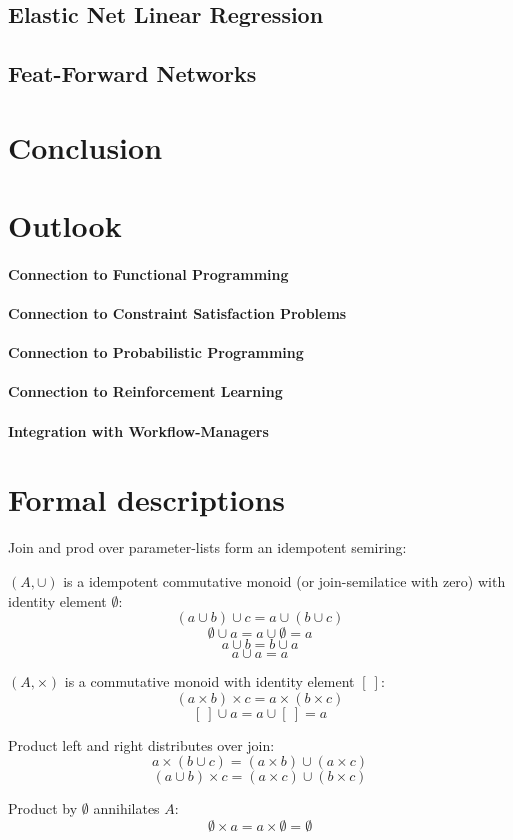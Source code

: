 \documentclass[english]{article}
\begin{document}
\subsection{Elastic Net Linear Regression}
\subsection{Feat-Forward Networks}

\section{Conclusion}

\section{Outlook}
\paragraph{Connection to Functional Programming}
\paragraph{Connection to Constraint Satisfaction Problems}
\paragraph{Connection to Probabilistic Programming}
\paragraph{Connection to Reinforcement Learning}
\paragraph{Integration with Workflow-Managers}

\appendix


\section{Formal descriptions}
Join and prod over parameter-lists form an idempotent semiring:

$(A, \cup)$ is a idempotent commutative monoid (or join-semilatice with zero) with identity element $\emptyset$:
$$(a \cup b) \cup c = a \cup (b \cup c)$$
$$\emptyset \cup a = a \cup \emptyset = a$$
$$a \cup b = b \cup a$$
$$a \cup a = a$$

$(A, \times)$ is a commutative monoid with identity element $[\ ]$:
$$(a \times b) \times c = a \times (b \times c)$$
$$[\ ] \cup a = a \cup [\ ] = a$$

Product left and right distributes over join:
$$a\times(b \cup c) = (a\times b) \cup (a\times c)$$
$$(a \cup b)\times c = (a\times c) \cup (b\times c)$$

Product by $\emptyset$ annihilates $A$:
$$\emptyset \times a = a \times \emptyset = \emptyset$$



\printbibliography
\end{document}
